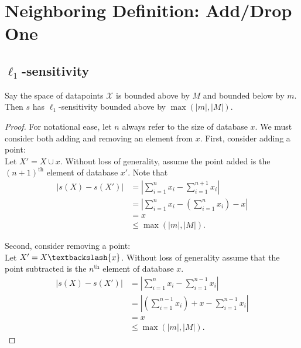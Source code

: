 \documentclass[11pt]{scrartcl} %
\begin{document}
\section{Neighboring Definition: Add/Drop One}
\subsection{$\ell_1$-sensitivity}

\begin{theorem}
Say the space of datapoints $\mathcal{X}$ is bounded above by $M$ and bounded below by $m$. Then $s$ has $\ell_1$-sensitivity bounded above by $\max(\vert m \vert,\vert M \vert).$
\end{theorem}


\begin{proof}
For notational ease, let $n$ always refer to the size of database $x$. We must consider both adding and removing an element from $x$. First, consider adding a point:\\

Let $X' = X \cup {x}$. Without loss of generality, assume the point added is the $(n+1)^{\text{th}}$ element of database $x'$. Note that
\begin{align*}
\left \vert s(X) - s(X') \right\vert &= \left\vert \sum_{i=1}^n x_i - \sum_{i=1}^{n+1} x_i \right\vert \\
	&= \left\vert \sum_{i=1}^n x_i - \left(\sum_{i=1}^n x_i\right) - x \right\vert \\
	&= x \\
	&\le \max(\vert m \vert,\vert M \vert).
\end{align*}

Second, consider removing a point: \\
Let $X' = X\textbackslash\{x\}$. Without loss of generality assume that the point subtracted is the $n^{\text{th}}$ element of database $x$.
\begin{align*}
\left \vert s(X) - s(X') \right\vert &= \left\vert \sum_{i=1}^n x_i - \sum_{i=1}^{n-1} x_i \right\vert \\
	&= \left\vert \left(\sum_{i=1}^{n-1} x_i \right) + x - \sum_{i=1}^{n-1} x_i \right\vert \\
	&= x \\
	&\le \max(\vert m \vert,\vert M \vert).
\end{align*}
\end{proof}
\end{document}
